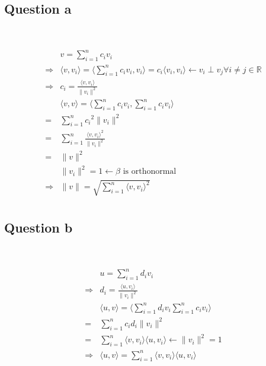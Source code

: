 \documentclass{article}
\def\R{\mathbb{R}}
\begin{document}
\subsection{Question a}

~

\begin{equation*}
    \begin{split}
        &v=\sum^n_{i=1}c_iv_i\\
        \Rightarrow&\langle v,v_i\rangle=\langle\sum^n_{i=1}c_iv_i,v_i\rangle=c_i\langle v_i,v_i\rangle\leftarrow v_i\perp v_j\forall i\ne j\in \R\\
        \Rightarrow&c_i=\frac{\langle v,v_i\rangle}{\|v_i\|^2}\\
        &\langle v,v\rangle=\langle\sum^n_{i=1}c_iv_i,\sum^n_{i=1}c_iv_i\rangle\\
        =&\sum_{i=1}^n{c_i}^2\|v_i\|^2\\
        =&\sum_{i=1}^n\frac{\langle v,v_i\rangle^2}{\|v_i\|^2}\\
        =&\|v\|^2\\
        &\|v_i\|^2=1\leftarrow \beta\text{ is orthonormal}\\
        \Rightarrow&\|v\|=\sqrt{\sum_{i=1}^n\langle v,v_i\rangle^2}\\
    \end{split}
\end{equation*}

\subsection{Question b}

~

\begin{equation*}
    \begin{split}
        &u=\sum^n_{i=1}d_iv_i\\
        \Rightarrow&d_i=\frac{\langle u,v_i\rangle}{\|v_i\|^2}\\
        &\langle u,v\rangle=\langle\sum^n_{i=1}d_iv_i\sum^n_{i=1}c_iv_i\rangle\\
        =&\sum^n_{i=1}c_id_i\|v_i\|^2\\
        =&\sum^n_{i=1}\langle v,v_i\rangle\langle u,v_i\rangle\leftarrow \|v_i\|^2=1\\
        \Rightarrow&\langle u,v\rangle=\sum^n_{i=1}\langle v,v_i\rangle\langle u,v_i\rangle\\
    \end{split}
\end{equation*}
\end{document}
